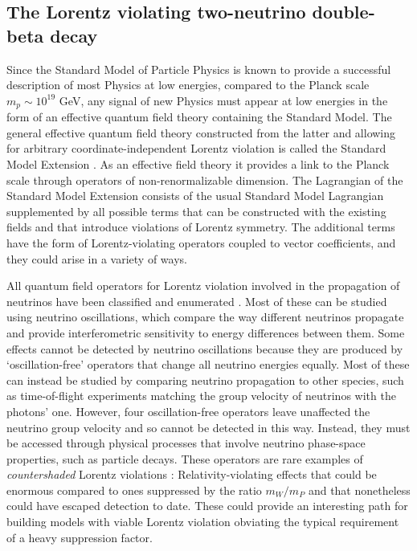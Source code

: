 \subsection*{The Lorentz violating two-neutrino double-beta decay}
Since the Standard Model of Particle Physics is known to provide a successful description of most Physics at low energies, compared to the Planck scale $m_p\sim10^{19}$ GeV, any signal of new Physics must appear at low energies in the form of an effective quantum field theory containing the Standard Model. The general effective quantum field theory constructed from the latter and allowing for arbitrary coordinate-independent Lorentz violation is called the Standard Model Extension \cite{SME1997,SME1998}. As an effective field theory it provides a link to the Planck scale through operators of non-renormalizable dimension. The Lagrangian of the Standard Model Extension consists of the usual Standard Model Lagrangian supplemented by all possible terms that can be constructed with the existing fields and that introduce violations of Lorentz symmetry. The additional terms have the form of Lorentz-violating operators coupled to vector coefficients, and they could arise in a variety of ways.

All quantum field operators for Lorentz violation involved in the propagation of neutrinos have been classified and enumerated \cite{SMEneutrinos}. Most of these can be studied using neutrino oscillations, which compare the way different neutrinos propagate and provide interferometric sensitivity to energy differences between them. Some effects cannot be detected by neutrino oscillations because they are produced by ‘oscillation-free’ operators that change all neutrino energies equally. Most of these can instead be studied by comparing neutrino propagation to other species, such as time-of-flight experiments matching the group velocity of neutrinos with the photons' one. However, four oscillation-free operators leave unaffected the neutrino group velocity and so cannot be detected in this way. Instead, they must be accessed through physical processes that involve neutrino phase-space properties, such as particle decays. These operators are rare examples of \textit{countershaded} Lorentz violations \cite{SMEcountersh}: Relativity-violating effects that could be enormous compared to ones suppressed by the ratio $m_W/m_P$ and that nonetheless could have escaped detection to date. These could provide an interesting path for building models with viable Lorentz violation obviating the typical requirement of a heavy suppression factor.

